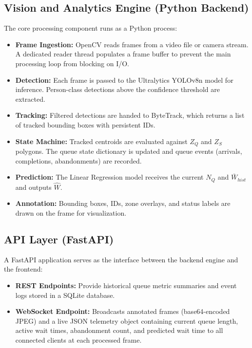 \documentclass[journal, twocolumn]{IEEEtran}
\begin{document}
\subsection{Vision and Analytics Engine (Python Backend)}
The core processing component runs as a Python process:
\begin{itemize}
    \item \textbf{Frame Ingestion:} OpenCV reads frames from a video file or camera stream. A dedicated reader thread populates a frame buffer to prevent the main processing loop from blocking on I/O.
    \item \textbf{Detection:} Each frame is passed to the Ultralytics YOLOv8n model for inference. Person-class detections above the confidence threshold are extracted.
    \item \textbf{Tracking:} Filtered detections are handed to ByteTrack, which returns a list of tracked bounding boxes with persistent IDs.
    \item \textbf{State Machine:} Tracked centroids are evaluated against $Z_Q$ and $Z_S$ polygons. The queue state dictionary is updated and queue events (arrivals, completions, abandonments) are recorded.
    \item \textbf{Prediction:} The Linear Regression model receives the current $N_Q$ and $\bar{W}_{hist}$ and outputs $\hat{W}$.
    \item \textbf{Annotation:} Bounding boxes, IDs, zone overlays, and status labels are drawn on the frame for visualization.
\end{itemize}

\subsection{API Layer (FastAPI)}
A FastAPI application serves as the interface between the backend engine and the frontend:
\begin{itemize}
    \item \textbf{REST Endpoints:} Provide historical queue metric summaries and event logs stored in a SQLite database.
    \item \textbf{WebSocket Endpoint:} Broadcasts annotated frames (base64-encoded JPEG) and a live JSON telemetry object containing current queue length, active wait times, abandonment count, and predicted wait time to all connected clients at each processed frame.
\end{itemize}
\end{document}
